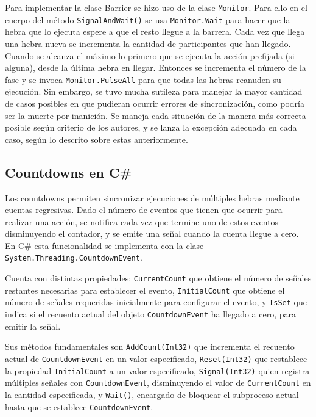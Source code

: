 \documentclass[10pt]{article} %
\newcommand{\csl}[1]{\colorbox{backcolour}{\texttt{#1}}}
\begin{document}
Para implementar la clase Barrier se hizo uso de la clase \csl{Monitor}. Para ello en el cuerpo del m\'etodo \csl{SignalAndWait()} se usa \csl{Monitor.Wait} para hacer que la hebra que lo ejecuta espere a que el resto llegue a la barrera. Cada vez que llega una hebra nueva se incrementa la cantidad de participantes que han llegado. Cuando se alcanza el m\'aximo lo primero que se ejecuta la acci\'on prefijada (si alguna), desde la \'ultima hebra en llegar. Entonces se incrementa el n\'umero de la fase y se invoca \csl{Monitor.PulseAll} para que todas las hebras reanuden su ejecuci\'on. Sin embargo, se tuvo mucha sutileza para manejar la mayor cantidad de casos posibles en que pudieran ocurrir errores de sincronizaci\'on, como podr\'ia ser la muerte por inanici\'on. Se maneja cada situaci\'on de la manera m\'as correcta posible seg\'un criterio de los autores, y se lanza la excepci\'on adecuada en cada caso, seg\'un lo descrito sobre estas anteriormente.

\subsection{Countdowns en C\#}

Los countdowns permiten sincronizar ejecuciones de m\'ultiples hebras mediante cuentas regresivas. Dado el n\'umero de eventos que tienen que ocurrir para realizar una acci\'on, se notifica cada vez que termine uno de estos eventos disminuyendo el contador, y se emite una se\~nal cuando la cuenta llegue a cero. En C\# esta funcionalidad se implementa con la clase \csl{System.Threading.CountdownEvent}. 

Cuenta con distintas propiedades: \csl{CurrentCount} que obtiene el número de señales restantes necesarias para establecer el evento, \csl{InitialCount} que obtiene el número de señales requeridas inicialmente para configurar el evento, y \csl{IsSet} que indica si el recuento actual del objeto \csl{CountdownEvent} ha llegado a cero, para emitir la se\~nal.
	
Sus m\'etodos fundamentales son \csl{AddCount(Int32)} que incrementa el recuento actual de \csl{CountdownEvent} en un valor especificado, \csl{Reset(Int32)} que restablece la propiedad \csl{InitialCount} a un valor especificado, \csl{Signal(Int32)} quien registra múltiples señales con \csl{CountdownEvent}, disminuyendo el valor de \csl{CurrentCount} en la cantidad especificada, y \csl{Wait()}, encargado de bloquear el subproceso actual hasta que se establece \csl{CountdownEvent}.
\end{document}
